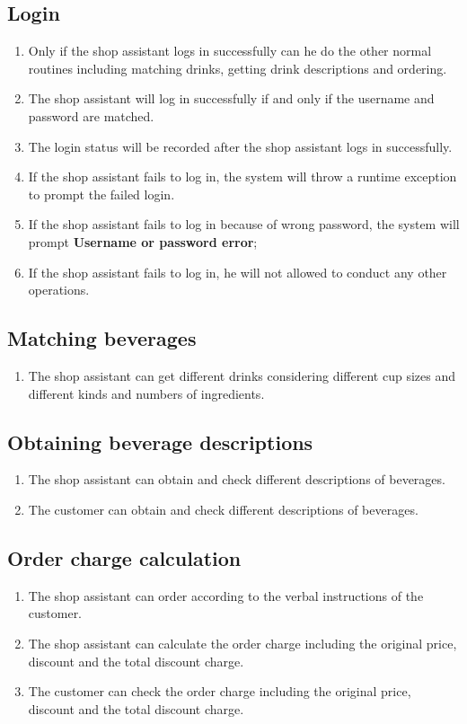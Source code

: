 \documentclass[a4paper]{report}
\begin{document}
\subsection{Login}
\begin{enumerate}
\item Only if the shop assistant logs in successfully can he do the other normal routines including matching drinks, getting drink descriptions and ordering.
\item The shop assistant will log in successfully if and only if the username and password are matched.
\item The login status will be recorded after the shop assistant logs in successfully.
\item If the shop assistant fails to log in, the system will throw a runtime exception to prompt the failed login.
\item If the shop assistant fails to log in because of wrong password, the system will prompt \textbf{Username or password error};
\item If the shop assistant fails to log in, he will not allowed to conduct any other operations.
\end{enumerate}

\subsection{Matching beverages}

\begin{enumerate}
\item The shop assistant can get different drinks considering different cup sizes and different kinds and numbers of ingredients.
\end{enumerate}

\subsection{Obtaining beverage descriptions}
\begin{enumerate}
\item The shop assistant can obtain and check different descriptions of beverages.
\item The customer can obtain and check different descriptions of beverages.
\end{enumerate}

\subsection{Order charge calculation}
\begin{enumerate}
\item The shop assistant can order according to the verbal instructions of the customer.
\item The shop assistant can calculate the order charge including the original price, discount and the total discount charge.
\item The customer can check the order charge including the original price, discount and the total discount charge.
\end{enumerate}
\end{document}
